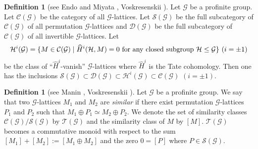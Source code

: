 \documentclass{amsart}
\theoremstyle{plain}
\theoremstyle{definition}
\newtheorem{definition}[theorem]{Definition}
\theoremstyle{remark}
\newcommand{\cC}{\mathcal{C}}\newcommand{\cD}{\mathcal{D}}
\newcommand{\cH}{\mathcal{H}}\newcommand{\cS}{\mathcal{S}}
\newcommand{\cT}{\mathcal{T}}
\newcounter{sub}\def\tr{\mbox{tr }}
\begin{document}
\begin{definition}[{see Endo and Miyata \cite[Section 1]{EM75}, Voskresenskii \cite[Section 4.7]{Vos98}}]
Let $\mathcal{G}$ be a profinite group. 
Let $\cC(\mathcal{G})$ be the category of all $\mathcal{G}$-lattices. 
Let $\cS(\mathcal{G})$ be the full subcategory of $\cC(\mathcal{G})$ of all permutation 
$\mathcal{G}$-lattices and $\cD(\mathcal{G})$ be the full subcategory of $\cC(\mathcal{G})$ 
of all invertible $\mathcal{G}$-lattices. 
Let 
\begin{align*}
\cH^i(\mathcal{G})=\{M\in \cC(\mathcal{G})\mid \widehat{H}^i(\mathcal{H},M)=0\ {\rm for\ any\ closed\ subgroup}\ \mathcal{H}\leq \mathcal{G}\}\ (i=\pm 1)
\end{align*}
be the class of ``$\widehat{H}^i$-vanish'' $\mathcal{G}$-lattices 
where $\widehat{H}^i$ is the Tate cohomology. 
Then one has the inclusions 
$\cS(\mathcal{G})\subset \cD(\mathcal{G})\subset \cH^i(\mathcal{G})\subset \cC(\mathcal{G})$ $(i=\pm 1)$. 
\end{definition}

\begin{definition}[{see Manin \cite[Appendix, page 285]{Man86}, Voskresenskii \cite[Section 4.7]{Vos98}}]
Let $\mathcal{G}$ be a profinite group. 
We say that two $\mathcal{G}$-lattices $M_1$ and $M_2$ are {\it similar} 
if there exist permutation $\mathcal{G}$-lattices $P_1$ and $P_2$ such that 
$M_1\oplus P_1\simeq M_2\oplus P_2$. 
We denote the set of similarity classes $\cC(\mathcal{G})/\cS(\mathcal{G})$ by $\cT(\mathcal{G})$ 
and the similarity class of $M$ by $[M]$. 
$\cT(\mathcal{G})$ becomes a commutative monoid 
with respect to the sum $[M_1]+[M_2]:=[M_1\oplus M_2]$ 
and the zero $0=[P]$ where $P\in \cS(\mathcal{G})$. 
\end{definition}
\end{document}
